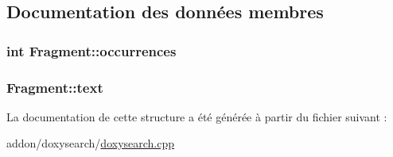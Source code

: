 \subsection{Documentation des données membres}
\hypertarget{struct_fragment_a4ddad010dfd5682bc7adf55142253441}{}
\subsubsection[{occurrences}]{\setlength{\rightskip}{0pt plus 5cm}int Fragment\+::occurrences}\label{struct_fragment_a4ddad010dfd5682bc7adf55142253441}
\hypertarget{struct_fragment_a2e023294ab0873fabbffbf82dcdc90b1}{}
\subsubsection[{text}]{ Fragment\+::text}\label{struct_fragment_a2e023294ab0873fabbffbf82dcdc90b1}


La documentation de cette structure a été générée à partir du fichier suivant \+:\begin{DoxyCompactItemize}
\item 
addon/doxysearch/\hyperlink{doxysearch_8cpp}{doxysearch.\+cpp}\end{DoxyCompactItemize}
